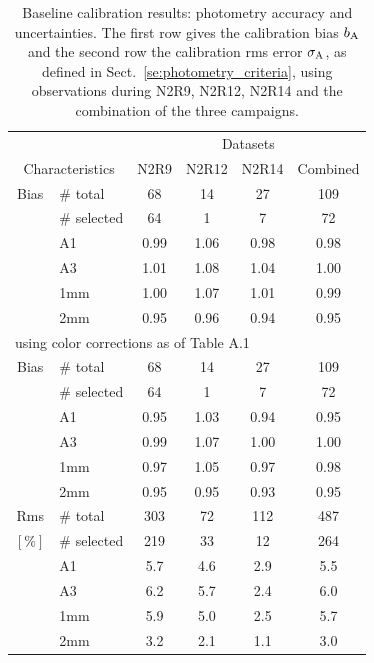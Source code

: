 \begin{table}[th]
\begin{center}
\begin{tabular}{|c|l|c|c|c|c|}
  \hline
  \multicolumn{2}{|c|}{}  &  \multicolumn{4}{|c|}{Datasets}  \\\cline{3-6}
  \multicolumn{2}{|c|}{Characteristics} &  N2R9  & N2R12   &  N2R14 &  Combined \\
  \hline\hline
  Bias &  $\#$ total    &  68    &  14     &   27     &    109    \\
       &  $\#$ selected &  64    &   1     &   7      &     72    \\
       &  A1            &  0.99  &  1.06   &   0.98   &   0.98    \\
       &  A3            &  1.01  &  1.08   &   1.04   &   1.00    \\
       &  1mm           &  1.00  &  1.07   &   1.01   &   0.99    \\
       &  2mm           &  0.95  &  0.96   &   0.94   &   0.95    \\
  \hline
  \multicolumn{6}{|l|}{using color corrections as of Table A.1}  \\
  \hline
  Bias &  $\#$ total    &  68    &  14     &   27     &    109    \\
       &  $\#$ selected &  64    &   1     &   7      &     72    \\
       &  A1            &  0.95  &  1.03   &   0.94   &   0.95    \\
       &  A3            &  0.99  &  1.07   &   1.00   &   1.00    \\
       &  1mm           &  0.97  &  1.05   &   0.97   &   0.98    \\
       &  2mm           &  0.95  &  0.95   &   0.93   &   0.95    \\
  \hline
  Rms  &  $\#$ total    &  303   &  72     &   112    &    487   \\
  $[\%]$ &  $\#$ selected &  219   &  33     &    12    &    264   \\
       &  A1            &  5.7   &  4.6    &   2.9    &    5.5   \\
       &  A3            &  6.2   &  5.7    &   2.4    &    6.0   \\
       &  1mm           &  5.9   &  5.0    &   2.5    &    5.7   \\
       &  2mm           &  3.2   &  2.1    &   1.1    &    3.0   \\  
\hline\hline
\end{tabular}
\caption[Baseline calibration results]{Baseline calibration results:
  photometry accuracy and uncertainties. The first row gives the
  calibration bias $b_{\rm A}$ and the second row the calibration
  rms error $\sigma_{\rm A}$, as defined in
  Sect.~\ref{se:photometry_criteria},
  using observations during N2R9, N2R12, N2R14 and the combination of
  the three campaigns.}
\label{tab:baseline-photometry}
\end{center}
\end{table}


